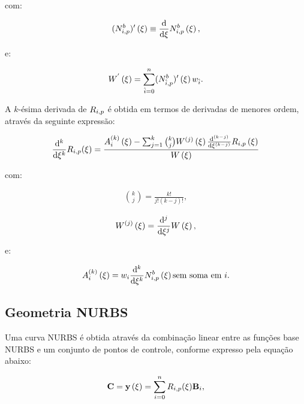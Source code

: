 \documentclass[tese_patricia]{subfiles}
\begin{document}
\noindent com:

\begin{align}
	(N^{b}_{i,p})'\left(\xi\right) \equiv \frac{\mathrm{d}}{\mathrm{d} \xi} N^b_{i,p}\left(\xi\right),
\end{align}

\noindent e:

\begin{align}
	W^{'}\left(\xi\right) = \sum_{\hat{i}=0}^{n} (N^{b}_{\hat{i},p})' \left(\xi\right) w_{\hat{i}}.
\end{align}

A $k$-ésima derivada de $R_{i,p}$ é obtida em termos de derivadas de menores ordem, através da seguinte expressão:

\begin{align}
\frac{\mathrm{d}^{k}}{\mathrm{d} \xi^{k}} R_{i,p}(\xi) = \frac{A_{i}^{\left(k\right)} \left(\xi\right) - \sum_{j=1}^{k} \binom{k}{j} W^{\left(j\right)} \left(\xi\right) \frac{\mathrm{d}^{(k-j)}}{\mathrm{d} \xi^{(k-j)}}R_{i,p} \left(\xi\right)}{W\left(\xi\right)}
\end{align}

\noindent com:

\begin{align}
\binom{k}{j} = \frac{k!}{j!\left(k-j\right)!} ,
\end{align}

\begin{align}
	W^{\left(j\right)}\left(\xi\right) = \frac{\mathrm{d}^{j}}{\mathrm{d} \xi^{j}} W \left(\xi\right) ,
\end{align}

\noindent e:

\begin{align}
 A_{i}^{\left(k\right)} \left(\xi\right)  = w_i \frac{\mathrm{d}^k}{\mathrm{d}\xi^k}N^b_{i,p} \left(\xi\right)\text{sem soma em $i$}.
\end{align}

\subsection{Geometria NURBS}

Uma curva NURBS é obtida através da combinação linear entre as funções base NURBS e um conjunto de pontos de controle, conforme expresso pela equação abaixo: 

\begin{align}
\mathbf{C} = \mathbf{y}\left(\xi\right) = \sum_{i=0}^{n}R_{i,p}(\xi)\mathbf{B}_i, \label{eq:curveNURBS}
\end{align}
\end{document}
